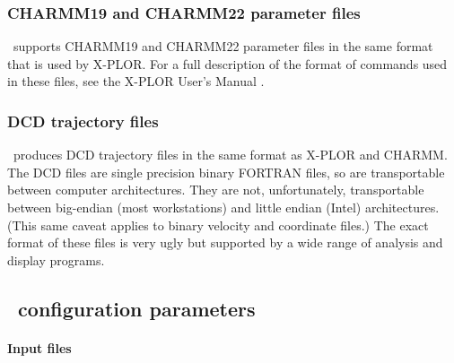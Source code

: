 \subsubsection{CHARMM19 and CHARMM22 parameter files}

\NAMD\ supports CHARMM19 and CHARMM22 parameter files in the same format 
that is used by X-PLOR.  
For a full description of the format of commands 
used in these files, see the X-PLOR User's Manual 
.  

\subsubsection{DCD trajectory files}

\NAMD\ produces DCD trajectory files in the same format as 
X-PLOR and CHARMM.  
The DCD files are single precision binary FORTRAN files, 
so are transportable between computer architectures.  
They are not, unfortunately, transportable between big-endian (most
workstations) and little endian (Intel) architectures.
(This same caveat applies to binary velocity and coordinate files.)
The exact format of these files is very ugly but supported by 
a wide range of analysis and display programs.  

\subsection{\NAMD\ configuration parameters}
\label{section:file_config}

\paragraph{Input files}


